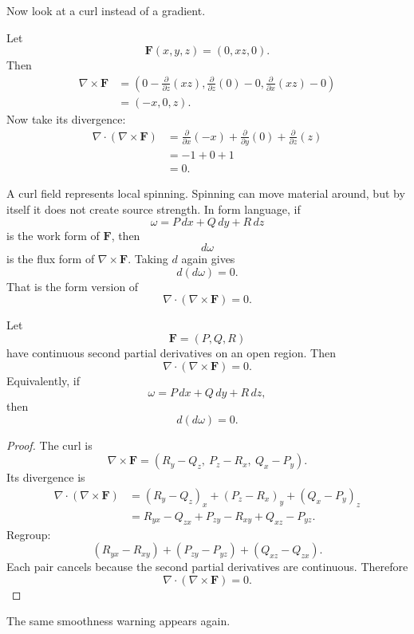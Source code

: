 Now look at a curl instead of a gradient.

Let
\[
    \mathbf F(x,y,z)=(0,xz,0).
\]
Then
\[
\begin{aligned}
\nabla\times\mathbf F
&=
\left(
0-\frac{\partial}{\partial z}(xz),
\frac{\partial}{\partial z}(0)-0,
\frac{\partial}{\partial x}(xz)-0
\right)\\
&=
(-x,0,z).
\end{aligned}
\]
Now take its divergence:
\[
\begin{aligned}
\nabla\cdot(\nabla\times\mathbf F)
&=
\frac{\partial}{\partial x}(-x)
+
\frac{\partial}{\partial y}(0)
+
\frac{\partial}{\partial z}(z)\\
&=
-1+0+1\\
&=
0.
\end{aligned}
\]

A curl field represents local spinning.  Spinning can move material around, but by
itself it does not create source strength.  In form language, if
\[
    \omega=P\,dx+Q\,dy+R\,dz
\]
is the work form of \(\mathbf F\), then
\[
    d\omega
\]
is the flux form of \(\nabla\times\mathbf F\).  Taking \(d\) again gives
\[
    d(d\omega)=0.
\]
That is the form version of
\[
    \nabla\cdot(\nabla\times\mathbf F)=0.
\]

\begin{theorem}
Let
\[
    \mathbf F=(P,Q,R)
\]
have continuous second partial derivatives on an open region.  Then
\[
\boxed{
    \nabla\cdot(\nabla\times\mathbf F)=0.
}
\]
Equivalently, if
\[
    \omega=P\,dx+Q\,dy+R\,dz,
\]
then
\[
\boxed{
    d(d\omega)=0.
}
\]
\end{theorem}

\begin{proof}
The curl is
\[
    \nabla\times\mathbf F
    =
    (R_y-Q_z,\ P_z-R_x,\ Q_x-P_y).
\]
Its divergence is
\[
\begin{aligned}
\nabla\cdot(\nabla\times\mathbf F)
&=
(R_y-Q_z)_x
+
(P_z-R_x)_y
+
(Q_x-P_y)_z\\
&=
R_{yx}-Q_{zx}+P_{zy}-R_{xy}+Q_{xz}-P_{yz}.
\end{aligned}
\]
Regroup:
\[
    (R_{yx}-R_{xy})
    +
    (P_{zy}-P_{yz})
    +
    (Q_{xz}-Q_{zx}).
\]
Each pair cancels because the second partial derivatives are continuous.  Therefore
\[
    \nabla\cdot(\nabla\times\mathbf F)=0.
\]
\end{proof}

The same smoothness warning appears again.

